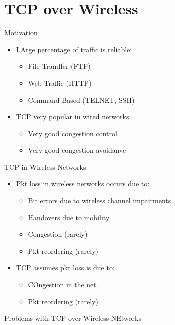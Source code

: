 \section{TCP over Wireless}
Motivation
\begin{itemize}
	\item LArge percentage of traffic is reliable:
	\begin{itemize}
		\item File Trandfer (FTP)
		\item Web Traffic (HTTP)
		\item Command Based (TELNET, SSH)
	\end{itemize}
	\item TCP very popular in wired networks
	\begin{itemize}
		\item Very good congestion control
		\item Very good congestion avoidanve
	\end{itemize}
\end{itemize}
TCP in Wireless Networks
\begin{itemize}
	\item Pkt loss in wireless networks occurs due to:
	\begin{itemize}
		\item Bit errors due to wireless channel impairments
		\item Handovers due to mobility
		\item Congestion (rarely)
		\item Pkt reordering (rarely)
	\end{itemize}
	\item TCP assumes pkt loss is due to:
	\begin{itemize}
		\item COngestion in the net.
		\item Pkt reordering (rarely)
	\end{itemize}
\end{itemize}
Problems with TCP over Wireless NEtworks
